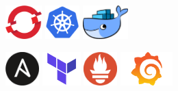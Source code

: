 \documentclass[]{friggeri-cv}
\begin{document}
\qquad \qquad  \includegraphics[height=13mm]{logo/openshift-logo.png}    \qquad \qquad  \includegraphics[height=13mm]{logo/kubernetes-logo.png}  \qquad \qquad 	\includegraphics[height=13mm]{logo/docker-logo.png}  \qquad \qquad 
\vspace{2mm}

\includegraphics[height=13mm]{logo/ansible-logo.png} \qquad \qquad 
\includegraphics[height=13mm]{logo/terraform-logo.png} \qquad \qquad 
\includegraphics[height=13mm]{logo/prometheus-logo.png} \qquad \qquad 
\includegraphics[height=13mm]{logo/grafana-logo.png} \qquad \qquad 
\vspace{2mm}
\end{document}
